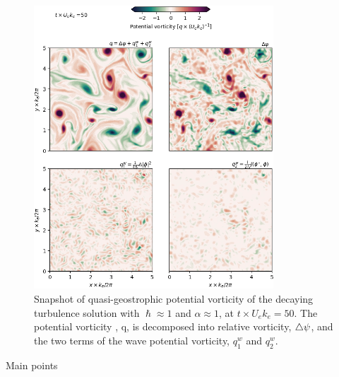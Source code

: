 \documentclass[final]{beamer}
\begin{document}
\begin{frame}[t]
\begin{columns}[t]
\begin{column}{0.55\textwidth}
\begin{columns}
\begin{column}{0.475\textwidth}
                        \begin{figure}
                          \includegraphics[width=0.8\textwidth]{figs/pv-terms_turbulence.png}
                          \caption{Snapshot of quasi-geostrophic potential vorticity
                                   of the decaying turbulence solution with $\hslash \approx 1$
                                   and $\alpha \approx 1$, at $t\times U_e k_e = 50$. The potential vorticity
                                   , q, is decomposed into relative vorticity, $\triangle\psi$,
                                   and the two terms of the wave potential vorticity, $q^w_1$ and $q^w_2$.}
                        \end{figure}


                      {
                      \begin{alertblock}{Main points}


\end{alertblock}}
\end{column}
\end{columns}
\end{column}
\end{columns}
\end{frame}
\end{document}
